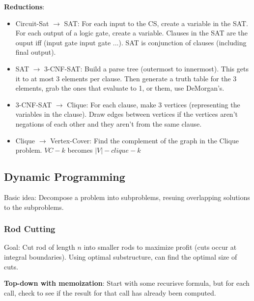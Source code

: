\documentclass[7pt]{article}
\begin{document}
\begin{multicols*}{4}
    {\bf Reductions}:
    \begin{itemize}
    \item Circuit-Sat $\rightarrow$ SAT: For each input to the CS, create a
      variable in the SAT.  For each output of a logic gate, create a
      variable.  Clauses in the SAT are the ouput iff (input gate
      input gate ...). SAT is conjunction of clauses (including final
      output).     
    \item SAT $\rightarrow$ 3-CNF-SAT: Build a parse tree (outermost
      to innermost).  This gets it to at most 3 elements per clause.
      Then generate a truth table for the 3 elements, grab the ones
      that evaluate to 1, or them, use DeMorgan's.  
    \item 3-CNF-SAT $\rightarrow$ Clique: For each clause, make 3
      vertices (representing the variables in the clause).  Draw edges
      between vertices if the vertices aren't negations of each other
      and they aren't from the same clause.
    \item Clique $\rightarrow$ Vertex-Cover: Find the complement of
      the graph in the Clique problem.  $VC-k$ becomes $|V| - clique-k$
    \end{itemize}


\subsection*{Dynamic Programming}
Basic idea: Decompose a problem into subproblems, resuing overlapping
solutions to the subproblems.

\subsubsection*{Rod Cutting}
Goal: Cut rod of length $n$ into smaller rods to maximize profit (cuts
occur at integral boundaries).  Using optimal substructure, can find
the optimal size of cuts.

{\bf Top-down with memoization}: Start with some recurisve formula, but
for each call, check to see if the result for that call has already
been computed.
\end{multicols*}
\end{document}
